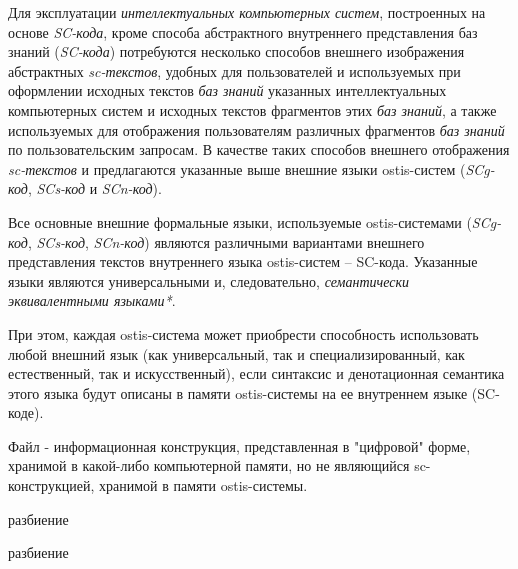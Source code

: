 Для эксплуатации \textit{интеллектуальных компьютерных систем}, построенных на основе \textit{SC-кода}, кроме способа абстрактного внутреннего представления баз знаний (\textit{SC-кода}) потребуются несколько способов внешнего изображения абстрактных \textit{sc-текстов}, удобных для пользователей и используемых при оформлении исходных текстов \textit{баз знаний} указанных интеллектуальных компьютерных систем и исходных текстов фрагментов этих \textit{баз знаний}, а также используемых для отображения пользователям различных фрагментов \textit{баз знаний} по пользовательским запросам.
В качестве таких способов внешнего отображения \textit{sc-текстов} и предлагаются указанные выше внешние языки ostis-систем (\textit{SCg-код}, \textit{SCs-код} и  \textit{SCn-код}).


Все основные внешние формальные языки, используемые ostis-системами (\textit{SCg-код}, \textit{SCs-код}, \textit{SCn-код}) являются различными вариантами внешнего представления текстов внутреннего языка ostis-систем -- SC-кода.
Указанные языки являются универсальными и, следовательно, \textit{семантически эквивалентными языками*}.

При этом, каждая ostis-система может приобрести способность использовать любой внешний язык (как универсальный, так и специализированный, как естественный, так и искусственный), если синтаксис и денотационная семантика этого языка будут описаны в памяти ostis-системы на ее внутреннем языке (SC-коде).

Файл - информационная конструкция, представленная в "цифровой" форме, хранимой в какой-либо компьютерной памяти, но не являющийся sc-конструкцией, хранимой в памяти ostis-системы.

\begin{scnrelfromset}{разбиение}
        \begin{scnindent}
            \begin{scnrelfromset}{разбиение}
            \end{scnrelfromset}
        \end{scnindent}
\end{scnrelfromset}

